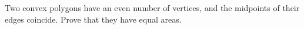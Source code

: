 Two convex polygons have an even number of vertices, and the midpoints of their edges coincide. Prove that they have equal areas.

